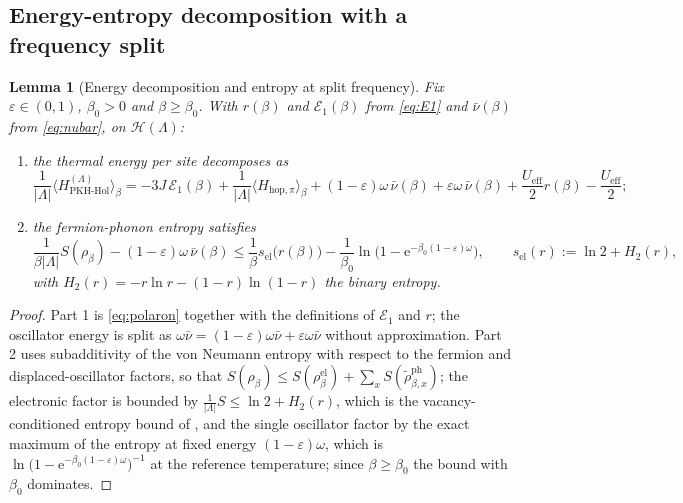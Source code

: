 \documentclass[11pt]{article}
\numberwithin{equation}{section}
\newcommand{\e}{\mathrm{e}}
\newcommand{\Lamb}{\Lambda}
\newcommand{\ph}{\mathrm{ph}}
\newcommand{\eff}{\mathrm{eff}}
\newcommand{\hop}{\mathrm{hop}}
\newcommand{\PKH}{\mathrm{PKH\text{-}Hol}}
\newtheorem{lemma}[theorem]{Lemma}
\theoremstyle{definition}
\begin{document}
\subsection{Energy-entropy decomposition with a frequency split}

\begin{lemma}[Energy decomposition and entropy at split frequency]\label{lem:split}
Fix $\varepsilon\in(0,1)$, $\beta_0>0$ and $\beta\ge\beta_0$. With $r(\beta)$ and
$\mathcal{E}_{1}(\beta)$ from \eqref{eq:E1} and $\bar\nu(\beta)$ from \eqref{eq:nubar}, on $\mathcal{H}(\Lamb)$:
\begin{enumerate}
\item the thermal energy per site decomposes as
  \begin{equation}
  \frac{1}{|\Lamb|}\big\langle H^{(\Lamb)}_{\PKH}\big\rangle_{\beta}
  =-3J\,\mathcal{E}_{1}(\beta)+\frac{1}{|\Lamb|}\big\langle H_{\hop,\pi}\big\rangle_{\beta}
  +(1-\varepsilon)\omega\,\bar\nu(\beta)+\varepsilon\omega\,\bar\nu(\beta)+\frac{U_{\eff}}{2}r(\beta)-\frac{U_{\eff}}{2};
  \label{eq:energy}
  \end{equation}
\item the fermion-phonon entropy satisfies
  \begin{equation}
  \frac{1}{\beta|\Lamb|}S(\rho_{\beta})-(1-\varepsilon)\omega\,\bar\nu(\beta)
  \le\frac{1}{\beta}s_{\mathrm{el}}\big(r(\beta)\big)-\frac{1}{\beta_0}\ln\Big(1-\e^{-\beta_0(1-\varepsilon)\omega}\Big),
  \qquad s_{\mathrm{el}}(r):=\ln2+H_{2}(r),
  \label{eq:entropy}
  \end{equation}
  with $H_{2}(r)=-r\ln r-(1-r)\ln(1-r)$ the binary entropy.
\end{enumerate}
\end{lemma}

\begin{proof}
Part 1 is \eqref{eq:polaron} together with the definitions of $\mathcal{E}_{1}$ and $r$; the
oscillator energy is split as $\omega\bar\nu=(1-\varepsilon)\omega\bar\nu+\varepsilon\omega\bar\nu$
without approximation. Part 2 uses subadditivity of the von Neumann entropy with respect
to the fermion and displaced-oscillator factors, so that
$S(\rho_{\beta})\le S(\rho^{\mathrm{el}}_{\beta})+\sum_{x}S(\tilde\rho^{\ph}_{\beta,x})$;
the electronic factor is bounded by $\frac{1}{|\Lamb|}S\le\ln2+H_{2}(r)$, which is the
vacancy-conditioned entropy bound of \cite{rens2026pkodlro}, and the single
oscillator factor by the exact maximum of the entropy at fixed energy
$(1-\varepsilon)\omega$, which is $\ln\big(1-\e^{-\beta_0(1-\varepsilon)\omega}\big)^{-1}$
at the reference temperature; since $\beta\ge\beta_0$ the bound with $\beta_0$ dominates.
\end{proof}
\end{document}

